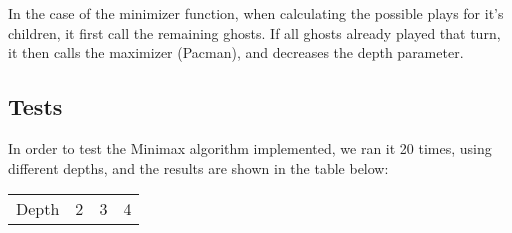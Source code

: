\documentclass{article}
\begin{document}
In the case of the minimizer function, when calculating the possible plays for it's children, it first call the remaining ghosts. If all ghosts already played that turn, it then calls the maximizer (Pacman), and decreases the depth parameter.

\subsection{Tests}

In order to test the Minimax algorithm implemented, we ran it 20 times, using different depths, and the results are shown in the table below: \\

\begin{table}[ht]
  \begin{center}
  \begin{tabular}{||c||c|c|c||}
    \hline
    Depth & 2 & 3 & 4 \\

\end{tabular}
\end{center}
\end{table}
\end{document}
